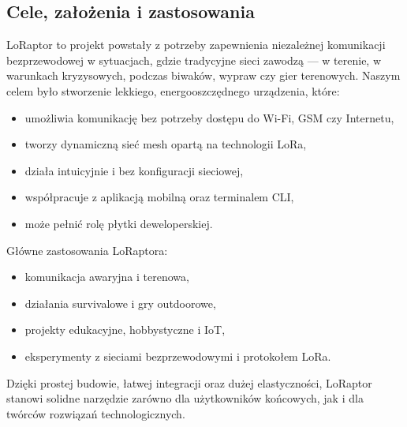 \subsection{Cele, założenia i zastosowania}

LoRaptor to projekt powstały z potrzeby zapewnienia niezależnej komunikacji bezprzewodowej w sytuacjach, gdzie tradycyjne sieci zawodzą --- w terenie, w warunkach kryzysowych, podczas biwaków, wypraw czy gier terenowych.
Naszym celem było stworzenie lekkiego, energooszczędnego urządzenia, które:
\begin{itemize}
	\item umożliwia komunikację bez potrzeby dostępu do Wi-Fi, GSM czy Internetu,
	\item tworzy dynamiczną sieć mesh opartą na technologii LoRa,
	\item działa intuicyjnie i bez konfiguracji sieciowej,
	\item współpracuje z aplikacją mobilną oraz terminalem CLI,
	\item może pełnić rolę płytki deweloperskiej.
\end{itemize}
Główne zastosowania LoRaptora:
\begin{itemize}
	\item komunikacja awaryjna i terenowa,
	\item działania survivalowe i gry outdoorowe,
	\item projekty edukacyjne, hobbystyczne i IoT,
	\item eksperymenty z sieciami bezprzewodowymi i protokołem LoRa.
\end{itemize}
Dzięki prostej budowie, łatwej integracji oraz dużej elastyczności, LoRaptor stanowi solidne narzędzie zarówno dla użytkowników końcowych, jak i dla twórców rozwiązań technologicznych.